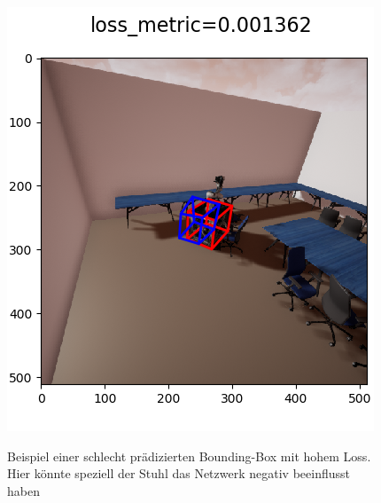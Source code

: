 \begin{figure}[!htb]
\begin{minipage}[b]{.5\linewidth}
      \includegraphics[width=\linewidth]{bbs/schlecht.png}
      \label{vdiffX_unsymm} 
      \caption{Beispiel einer schlecht prädizierten Bounding-Box mit hohem Loss. Hier könnte speziell der Stuhl das Netzwerk negativ beeinflusst haben}
   \end{minipage}
\end{figure}
\newpage